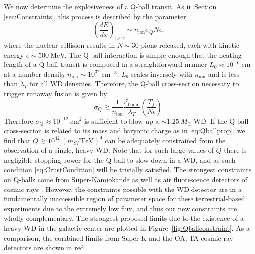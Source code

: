 \documentclass[twocolumn,preprintnumbers,amsmath,amssymb,prl, superscriptaddress]{revtex4}
\newcommand{\Eboom}{\mathcal{E}_\text{boom}}
\def\r{\right)}
\def\l{\left(}
\begin{document}
We now determine the explosiveness of a Q-ball transit.
As in Section \ref{sec:Constraints}, this process is described by the parameter
\begin{equation}
\l\frac{dE}{dx}\r_\text{LET} \sim n_\text{ion} \sigma_Q N \epsilon,
\end{equation}
where the nuclear collision results in $N \sim 30$ pions released, each with kinetic energy $\epsilon \sim 500 ~\text{MeV}$.
The Q-ball interaction is simple enough that the heating length of a Q-ball transit is computed in a straightforward manner $L_0 \approx 10^{-6} ~\text{cm}$ at a number density $n_\text{ion} \sim 10^{32}~\text{cm}^{-3}$.
$L_0$ scales inversely with $n_\text{ion}$ and is less than $\lambda_T$ for all WD densities.
Therefore, the Q-ball cross-section necessary to trigger runaway fusion is given by
\begin{equation}
\sigma_Q \gtrsim \frac{1}{n_\text{ion}} \frac{\Eboom}{\lambda_T} \l \frac{T_f}{N \epsilon} \r.
\end{equation}
Therefore $\sigma_Q \approx 10^{-12} ~\text{cm}^2$ is sufficient to blow up a $\sim 1.25 ~M_{\odot}$ WD.
If the Q-ball cross-section is related to its mass and baryonic charge as in \eqref{eq:Qballprop}, we find that $Q \gtrsim 10^{42} ~(m_S/\text{TeV})^4$ can be adequately constrained from the observation of a single, heavy WD.
Note that for such large values of $Q$ there is negligible stopping power for the Q-ball to slow down in a WD, and as such condition \eqref{eq:CrustCondition} will be trivially satisfied.
The strongest constraints on Q-balls come from Super-Kamiokande as well as air fluorescence detectors of cosmic rays \cite{Dine:2003ax}.
However, the constraints possible with the WD detector are in a fundamentally inaccessible region of parameter space for these terrestrial-based experiments due to the extremely low flux, and thus our new constraints are wholly complementary.
The strongest proposed limits due to the existence of a heavy WD in the galactic center are plotted in Figure~\ref{fig:Qballconstraint}. As a comparison, the combined limits from Super-K and the OA, TA cosmic ray detectors are shown in red.
\end{document}
